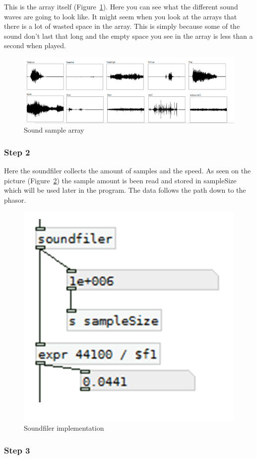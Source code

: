 This is the array itself (Figure~\ref{fig:implementation3}). 
Here you can see what the different sound waves are going to look like. 
It might seem when you look at the arrays that there is a lot of wasted space in the array. 
This is simply because some of the sound don’t last that long and the empty space you see in the array is less than a second when played.

\begin{figure}[!htbp]
    \centering
    \includegraphics[width=.5\textwidth]{images/Implementation3.png}
    \caption{Sound sample array}
    \label{fig:implementation3}
\end{figure}


\FloatBarrier
\subsubsection*{Step 2} %
\label{ssub:step_2}

Here the soundfiler collects the amount of samples and the speed. 
As seen on the picture (Figure~\ref{fig:implementation4}) the sample amount is been read and stored in sampleSize which will be used later in the program. 
The data follows the path down to the phasor.

\begin{figure}[!htbp]
    \centering
    \includegraphics[width=.3\textwidth]{images/Implementation4.png}
    \caption{Soundfiler implementation}
    \label{fig:implementation4}
\end{figure}


\FloatBarrier
\subsubsection*{Step 3} %
\label{ssub:step_3}

